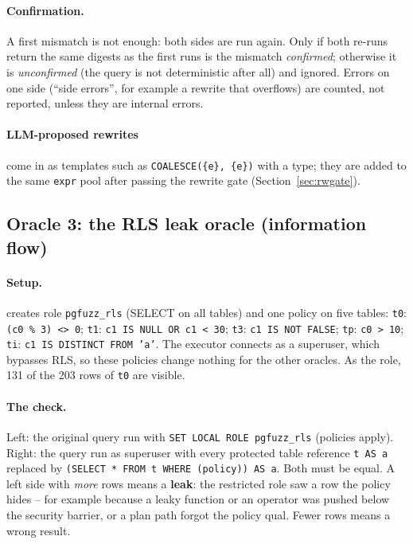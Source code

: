 \paragraph{Confirmation.} A first mismatch is not enough: both sides are run
again. Only if both re-runs return the same digests as the first runs is the
mismatch \emph{confirmed}; otherwise it is \emph{unconfirmed} (the query is
not deterministic after all) and ignored. Errors on one side (``side errors'',
for example a rewrite that overflows) are counted, not reported, unless they are
internal errors.

\paragraph{LLM-proposed rewrites} come in as templates such as
\texttt{COALESCE(\{e\}, \{e\})} with a type; they are added to the same
\texttt{expr} pool after passing the rewrite gate (Section~\ref{sec:rwgate}).

\subsection{Oracle 3: the RLS leak oracle (information flow)}
\label{sec:rls}

\paragraph{Setup.}  creates role \texttt{pgfuzz\_rls}
(SELECT on all tables) and one policy on five tables:
\texttt{t0}: \texttt{(c0 \% 3) <> 0};
\texttt{t1}: \texttt{c1 IS NULL OR c1 < 30};
\texttt{t3}: \texttt{c1 IS NOT FALSE};
\texttt{tp}: \texttt{c0 > 10};
\texttt{ti}: \texttt{c1 IS DISTINCT FROM 'a'}.
The executor connects as a superuser, which bypasses RLS, so these policies
change nothing for the other oracles. As the role, 131 of the 203 rows of
\texttt{t0} are visible.

\paragraph{The check.} Left: the original query run with \texttt{SET LOCAL
ROLE pgfuzz\_rls} (policies apply). Right: the query run as superuser with
every protected table reference \texttt{t AS a} replaced by
\texttt{(SELECT * FROM t WHERE (policy)) AS a}. Both must be equal. A left side
with \emph{more} rows means a \textbf{leak}: the restricted role saw a row the
policy hides -- for example because a leaky function or an operator was pushed
below the security barrier, or a plan path forgot the policy qual. Fewer rows
means a wrong result.

